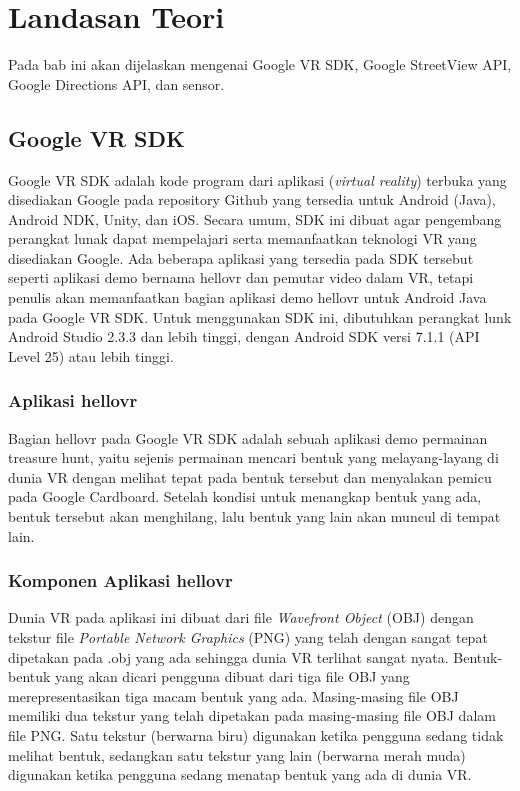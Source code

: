 \chapter{Landasan Teori}
\label{chap:teori}
Pada bab ini akan dijelaskan mengenai Google VR SDK, Google StreetView API, Google Directions API, dan sensor.

\section{Google VR SDK}
\label{sec:vrsdk} 
Google VR SDK adalah kode program dari aplikasi ({\it virtual reality}) terbuka yang disediakan Google pada repository Github yang tersedia untuk Android (Java), Android NDK, Unity, dan iOS. Secara umum, SDK ini dibuat agar pengembang perangkat lunak dapat mempelajari serta memanfaatkan teknologi VR yang disediakan Google. Ada beberapa aplikasi yang tersedia pada SDK tersebut seperti aplikasi demo bernama hellovr dan pemutar video dalam VR, tetapi penulis akan memanfaatkan bagian aplikasi demo hellovr untuk Android Java pada Google VR SDK. Untuk menggunakan SDK ini, dibutuhkan perangkat lunk Android Studio 2.3.3 dan lebih tinggi, dengan Android SDK versi 7.1.1 (API Level 25) atau lebih tinggi.

\subsection{Aplikasi hellovr}
\label{subs:hellovr}
Bagian hellovr pada Google VR SDK adalah sebuah aplikasi demo permainan treasure hunt, yaitu sejenis permainan mencari bentuk yang melayang-layang di dunia VR dengan melihat tepat pada bentuk tersebut dan menyalakan pemicu pada Google Cardboard. Setelah kondisi untuk menangkap bentuk yang ada, bentuk tersebut akan menghilang, lalu bentuk yang lain akan muncul di tempat lain. 

\subsection{Komponen Aplikasi hellovr}
\label{subs:komponen}
Dunia VR pada aplikasi ini dibuat dari file {\it Wavefront Object} (OBJ) dengan tekstur file {\it Portable Network Graphics} (PNG) yang telah dengan sangat tepat dipetakan pada .obj yang ada sehingga dunia VR terlihat sangat nyata. Bentuk-bentuk yang akan dicari pengguna dibuat dari tiga file OBJ yang merepresentasikan tiga macam bentuk yang ada. Masing-masing file OBJ memiliki dua tekstur yang telah dipetakan pada masing-masing file OBJ dalam file PNG. Satu tekstur (berwarna biru) digunakan ketika pengguna sedang tidak melihat bentuk, sedangkan satu tekstur yang lain (berwarna merah muda) digunakan ketika pengguna sedang menatap bentuk yang ada di dunia VR.

